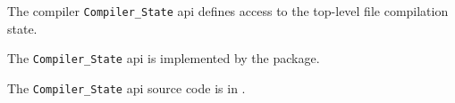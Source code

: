 
The compiler {\tt Compiler\_State} api defines access to the top-level 
file compilation state.

The {\tt Compiler\_State} api is implemented by the  package.

The {\tt Compiler\_State} api source code is in .





